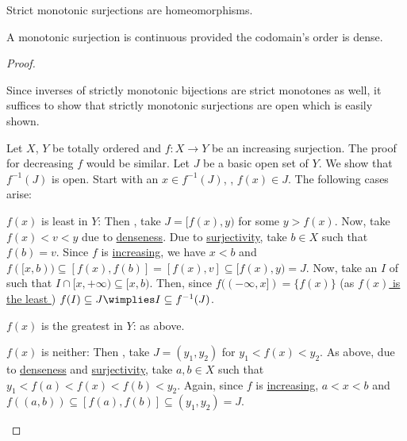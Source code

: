	
	\begin{prp}
		\leavevmode
		\begin{mylist}
			\item Strict monotonic surjections are homeomorphisms.
			
			\item A monotonic surjection is continuous provided the codomain's order is dense.
		\end{mylist}
	\end{prp}
	
	\begin{proof}
		\begin{mylist}
			\item Since inverses of strictly monotonic bijections are strict monotones as well, it suffices to show that strictly monotonic surjections are open which is easily shown.
			
			\item Let $X$, $Y$ be totally ordered and $f\colon X\to Y$ be an increasing surjection. The proof for decreasing $f$ would be similar. Let $J$ be a basic open set of $Y$. We show that $f^{-1}(J)$ is open. Start with an $x\in f^{-1}(J)$, \ie, $f(x)\in J$. The following cases arise:
			\begin{mylist}
				\item $f(x)$ is least in $Y$: Then \wlogg, take $J = [f(x), y)$ for some $y > f(x)$. Now, take $f(x) < v < y$ due to \uline{denseness}. Due to \uline{surjectivity}, take $b\in X$ such that $f(b) = v$. Since $f$ is \uline{increasing}, we have $x < b$ and $f([x, b))\subseteq [f(x), f(b)] = [f(x), v]\subseteq [f(x), y) = J$. Now, take an \onbd $I$ of such that $I\cap [x, +\infty)\subseteq [x, b)$. Then, since $f((-\infty, x]) = \{f(x)\}$ (as \uline{$f(x)$ is the least \elt}) $f(I)\subseteq J\wimplies I\subseteq f^{-1}(J)$.
				
				\item $f(x)$ is the greatest in $Y$: \Lly as above.
				
				\item $f(x)$ is neither: Then \wlogg, take $J = (y_1, y_2)$ for $y_1 < f(x) < y_2$. As above, due to \uline{denseness} and \uline{surjectivity}, take $a, b\in X$ such that $y_1 < f(a) < f(x) < f(b) < y_2$. Again, since $f$ is \uline{increasing}, $a < x < b$ and $f((a, b))\subseteq [f(a), f(b)]\subseteq (y_1, y_2) = J$.
				\qedhere
			\end{mylist}
		\end{mylist}
	\end{proof}
	
